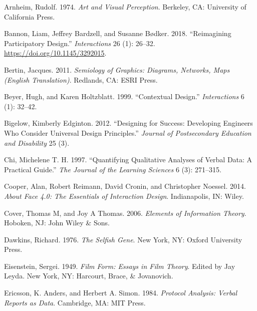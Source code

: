 \hypertarget{refs}{}
\begin{CSLReferences}{1}{0}
\leavevmode{}%
Arnheim, Rudolf. 1974. \emph{Art and Visual Perception}. Berkeley, CA:
University of California Press.

\leavevmode{}%
Bannon, Liam, Jeffrey Bardzell, and Susanne Bødker. 2018. {``Reimagining
Participatory Design.''} \emph{Interactions} 26 (1): 26--32.
\url{https://doi.org/10.1145/3292015}.

\leavevmode{}%
Bertin, Jacques. 2011. \emph{Semiology of Graphics: Diagrams, Networks,
Maps (English Translation)}. Redlands, CA: {ESRI} Press.

\leavevmode{}%
Beyer, Hugh, and Karen Holtzblatt. 1999. {``Contextual Design.''}
\emph{Interactions} 6 (1): 32--42.

\leavevmode{}%
Bigelow, Kimberly Edginton. 2012. {``Designing for Success: Developing
Engineers Who Consider Universal Design Principles.''} \emph{Journal of
Postsecondary Education and Disability} 25 (3).

\leavevmode{}%
Chi, Michelene T. H. 1997. {``Quantifying Qualitative Analyses of Verbal
Data: A Practical Guide.''} \emph{The Journal of the Learning Sciences}
6 (3): 271--315.

\leavevmode{}%
Cooper, Alan, Robert Reimann, David Cronin, and Christopher Noessel.
2014. \emph{About Face 4.0: The Essentials of Interaction Design}.
Indianapolis, IN: Wiley.

\leavevmode{}%
Cover, Thomas M, and Joy A Thomas. 2006. \emph{Elements of Information
Theory}. Hoboken, NJ: John Wiley \& Sons.

\leavevmode{}%
Dawkins, Richard. 1976. \emph{The Selfish Gene}. New York, NY: Oxford
University Press.

\leavevmode{}%
Eisenstein, Sergei. 1949. \emph{Film Form: Essays in Film Theory}.
Edited by Jay Leyda. New York, NY: {Harcourt, Brace, \& Jovanovich}.

\leavevmode{}%
Ericsson, K. Anders, and Herbert A. Simon. 1984. \emph{Protocol
Analysis: Verbal Reports as Data}. Cambridge, MA: MIT Press.


\end{CSLReferences}
